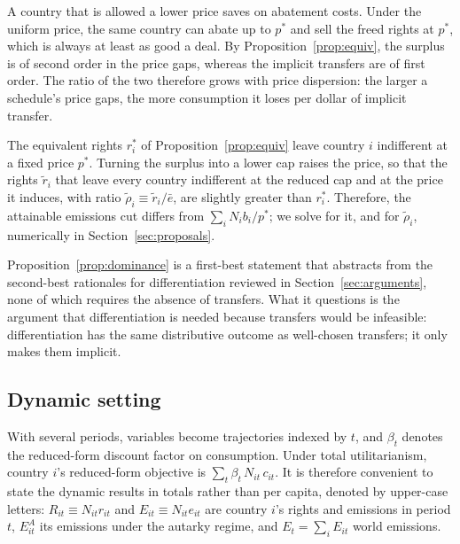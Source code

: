 \documentclass[12pt,english]{article}
\theoremstyle{remark}
\begin{document}
A country that is allowed a lower price saves on abatement costs. %
Under the uniform price, the same country can abate up to $p^*$ and sell the freed rights at $p^*$, which is always at least as good a deal. By Proposition~\ref{prop:equiv}, the surplus is of second order in the price gaps, whereas the implicit transfers are of first order. The ratio of the two therefore grows with price dispersion: the larger a schedule's price gaps, the more consumption it loses per dollar of implicit transfer. %

The equivalent rights $r^*_i$ of Proposition~\ref{prop:equiv} leave country $i$ indifferent at a fixed price $p^*$. Turning the surplus into a lower cap raises the price, so that the rights $\tilde r_i$ that leave every country indifferent at the reduced cap and at the price it induces, with ratio $\tilde\rho_i\equiv\tilde r_i/\bar e$, are slightly greater than $r^*_i$. Therefore, the attainable emissions cut differs from $\sum_i N_i b_i/p^*$; we solve for it, and for $\tilde\rho_i$, numerically in Section~\ref{sec:proposals}.

Proposition~\ref{prop:dominance} is a first-best statement that abstracts from the second-best rationales for differentiation reviewed in Section~\ref{sec:arguments}, none of which requires the absence of transfers.
What it questions is the argument that differentiation is needed because transfers would be infeasible: differentiation has the same distributive outcome as well-chosen transfers; it only makes them implicit.

\subsection{Dynamic setting}
\label{sec:dynamic}

With several periods, variables become trajectories indexed by $t$, and $\beta_t$ denotes the reduced-form discount factor on consumption. Under total utilitarianism, country $i$'s reduced-form objective is $\sum_t \beta_t\,N_{it}\,c_{it}$. %
It is therefore convenient to state the dynamic results in totals rather than per capita, denoted by upper-case letters: $R_{it}\equiv N_{it}r_{it}$ and $E_{it}\equiv N_{it}e_{it}$ are country $i$'s rights and emissions in period $t$, $E^A_{it}$ its emissions under the autarky regime, and $E_t=\sum_i E_{it}$ world emissions.
\end{document}
